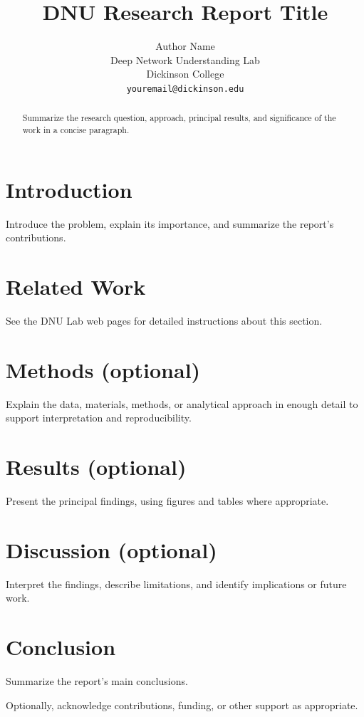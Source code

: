 \documentclass{article}
\title{DNU Research Report Title}
\author{%
  Author Name\\
  Deep Network Understanding Lab\\
  Dickinson College\\
  \texttt{youremail@dickinson.edu}
}
\begin{document}
\maketitle

\begin{abstract}
  Summarize the research question, approach, principal results, and significance
  of the work in a concise paragraph.
\end{abstract}

\section{Introduction}

Introduce the problem, explain its importance, and summarize the report's
contributions.

\section{Related Work}

See the DNU Lab web pages for detailed instructions about this section.

\section{Methods (optional)}

Explain the data, materials, methods, or analytical approach in enough detail
to support interpretation and reproducibility.

\section{Results (optional)}

Present the principal findings, using figures and tables where appropriate.

\section{Discussion (optional)}

Interpret the findings, describe limitations, and identify implications or
future work.

\section{Conclusion}

Summarize the report's main conclusions.

\begin{ack}
  Optionally, acknowledge contributions, funding, or other support as appropriate.
\end{ack}
\end{document}
